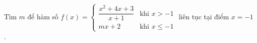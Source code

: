 \begin{ex}
Tìm $m$ để hàm số $f(x)=\begin{cases}\dfrac{x^2+4x+3}{x+1}&\text{khi }x>-1\\mx+2&\text{khi }x\le-1\end{cases}$ liên tục tại điểm $x=-1$.
\end{ex}
